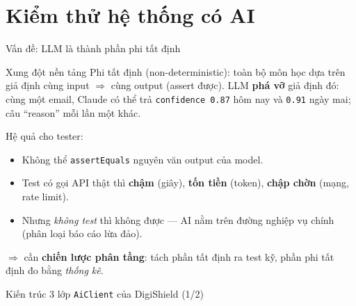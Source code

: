 \documentclass[aspectratio=169,12pt]{beamer}
\begin{document}
\section{Kiểm thử hệ thống có AI}

\begin{frame}{Vấn đề: LLM là thành phần phi tất định}
  \begin{alertblock}{Xung đột nền tảng}
    Phi tất định (non-deterministic): toàn bộ môn học dựa trên giả định
    cùng input $\Rightarrow$ cùng output (assert được).
    LLM \textbf{phá vỡ} giả định đó: cùng một email, Claude có thể trả
    \texttt{confidence 0.87} hôm nay và \texttt{0.91} ngày mai; câu ``reason'' mỗi lần một khác.
  \end{alertblock}
  Hệ quả cho tester:
  \begin{itemize}
    \item Không thể \texttt{assertEquals} nguyên văn output của model.
    \item Test có gọi API thật thì \textbf{chậm} (giây), \textbf{tốn tiền} (token), \textbf{chập chờn} (mạng, rate limit).
    \item Nhưng \emph{không test} thì không được --- AI nằm trên đường nghiệp vụ chính (phân loại báo cáo lừa đảo).
  \end{itemize}
  $\Rightarrow$ cần \textbf{chiến lược phân tầng}: tách phần tất định ra test kỹ, phần phi tất định đo bằng \emph{thống kê}.
\end{frame}

\begin{frame}{Kiến trúc 3 lớp \texttt{AiClient} của DigiShield (1/2)}
  \begin{center}
  \end{center}
\end{frame}
\end{document}
